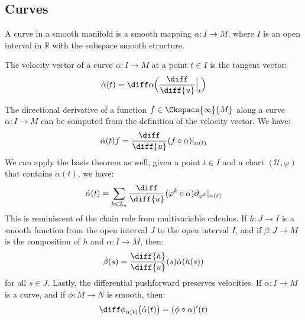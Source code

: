     \subsection{Curves}
        \begin{definition}
            A curve in a smooth manifold is a smooth mapping
            $\alpha:I\rightarrow{M}$, where $I$ is an open interval in
            $\mathbb{R}$ with the subspace smooth structure.
        \end{definition}
        \begin{definition}
            The velocity vector of a curve $\alpha:I\rightarrow{M}$ at a
            point $t\in{I}$ is the tangent vector:
            \begin{equation}
                \dot{\alpha}(t)=\diff\alpha\Big(
                    \frac{\diff}{\diff{u}}\Big|_{t}
                \Big)
            \end{equation}
        \end{definition}
        The directional derivative of a function $f\in\Ckspace{\infty}{M}$
        along a curve $\alpha:I\rightarrow{M}$ can be computed from the
        definition of the velocity vector. We have:
        \begin{equation}
            \dot{\alpha}(t)f
            =\frac{\diff}{\diff{u}}(f\circ\alpha)|_{\alpha(t)}
        \end{equation}
        We can apply the basis theorem as well, given a point $t\in{I}$ and
        a chart $(\mathcal{U},\varphi)$ that contains $\alpha(t)$, we have:
        \begin{equation}
            \dot{\alpha}(t)=\sum_{k\in\mathbb{Z}_{n}}
                \frac{\diff}{\diff{u}}(\varphi^{k}\circ\alpha)
                \partial_{\varphi^{k}}|_{\alpha(t)}
        \end{equation}
        This is reminiscent of the chain rule from multivariable calculus.
        If $h:J\rightarrow{I}$ is a smooth function from the open interval
        $J$ to the open interval $I$, and if $\beta:J\rightarrow{M}$ is the
        composition of $h$ and $\alpha:I\rightarrow{M}$, then:
        \begin{equation}
            \dot{\beta}(s)=\frac{\diff{h}}{\diff{u}}(s)\dot{\alpha}(h(s))
        \end{equation}
        for all $s\in{J}$. Lastly, the differential pushforward preserves
        velocities. If $\alpha:I\rightarrow{M}$ is a curve, and if
        $\phi:M\rightarrow{N}$ is smooth, then:
        \begin{equation}
            \diff\phi_{\alpha(t)}\big(\dot{\alpha}(t)\big)=
                (\phi\circ\alpha)'(t)
        \end{equation}
